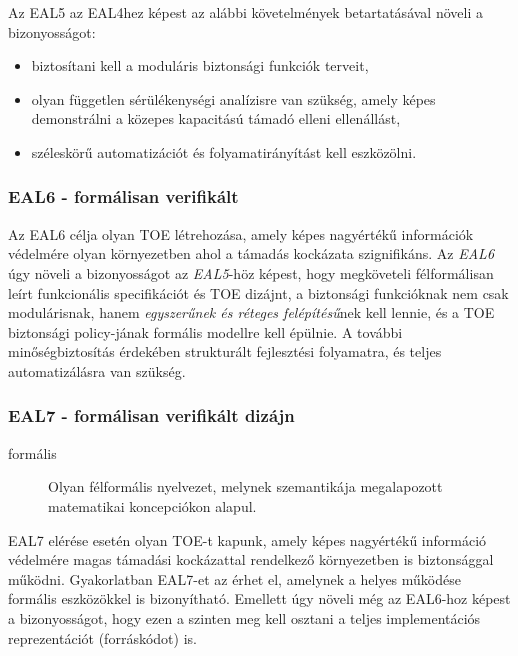 Az EAL5 az EAL4hez képest az alábbi követelmények betartatásával növeli
a bizonyosságot:
\begin{itemize}
    \item biztosítani kell a moduláris biztonsági funkciók terveit,
    \item olyan független sérülékenységi analízisre van szükség, amely képes demonstrálni a közepes
        kapacitású támadó elleni ellenállást,
    \item széleskörű automatizációt és folyamatirányítást kell eszközölni.
\end{itemize}

\subsubsection{EAL6 - formálisan verifikált}
Az EAL6 célja olyan TOE létrehozása, amely képes nagyértékű információk védelmére olyan környezetben
ahol a támadás kockázata szignifikáns.  Az \emph{EAL6} úgy növeli a bizonyosságot az \emph{EAL5}-höz
képest, hogy megköveteli félformálisan leírt funkcionális specifikációt és TOE dizájnt, a biztonsági
funkcióknak nem csak modulárisnak, hanem \emph{egyszerűnek és réteges felépítésű}nek kell lennie, és
a TOE biztonsági policy-jának formális modellre kell épülnie. A további minőségbiztosítás érdekében
strukturált fejlesztési folyamatra, és teljes automatizálásra van szükség.

\subsubsection{EAL7 - formálisan verifikált dizájn}
\begin{description}
    \item[formális]{Olyan félformális nyelvezet, melynek szemantikája megalapozott matematikai
        koncepciókon alapul.}
\end{description}

EAL7 elérése esetén olyan TOE-t kapunk, amely képes nagyértékű információ védelmére magas támadási
kockázattal rendelkező környezetben is biztonsággal működni. Gyakorlatban EAL7-et az érhet el,
amelynek a helyes működése formális eszközökkel is bizonyítható.
Emellett úgy növeli még az EAL6-hoz képest a bizonyosságot, hogy ezen a szinten meg kell osztani
a teljes implementációs reprezentációt (forráskódot) is.

